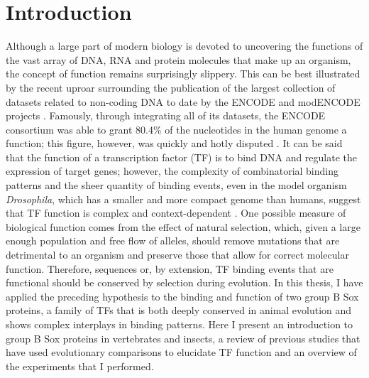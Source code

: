 \chapter{Introduction}

\hrulefill

Although a large part of modern biology is devoted to uncovering the functions of the vast array of DNA, RNA and protein molecules that make up an organism, the concept of function remains surprisingly slippery. This can be best illustrated by the recent uproar surrounding the publication of the largest collection of datasets related to non-coding DNA to date by the ENCODE and modENCODE projects \citep{the_modencode_consortium_identification_2010, dunham_integrated_2012}. Famously, through integrating all of its datasets, the ENCODE consortium was able to grant 80.4\% of the nucleotides in the human genome a function; this figure, however, was quickly and hotly disputed \citep{dunham_integrated_2012,graur_immortality_2013}. It can be said that the function of a transcription factor (TF) is to bind DNA and regulate the expression of target genes; however, the complexity of combinatorial binding patterns and the sheer quantity of binding events, even in the model organism \emph{Drosophila}, which has a smaller and more compact genome than humans, suggest that TF function is complex and context-dependent \citep{biggin_animal_2011,kaplan_quantitative_2011,neph_expansive_2012,zinzen_combinatorial_2009}. One possible measure of biological function comes from the effect of natural selection, which, given a large enough population and free flow of alleles, should remove mutations that are detrimental to an organism and preserve those that allow for correct molecular function. Therefore, sequences or, by extension, TF binding events that are functional should be conserved by selection during evolution. In this thesis, I have applied the preceding hypothesis to the binding and function of two group B Sox proteins, a family of TFs that is both deeply conserved in animal evolution and shows complex interplays in binding patterns. Here I present an introduction to group B Sox proteins in vertebrates and insects, a review of previous studies that have used evolutionary comparisons to elucidate TF function and an overview of the experiments that I performed.  

